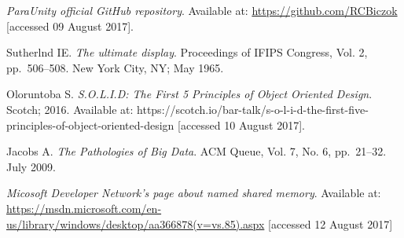 \begin{thebibliography}{99}
\textit{ParaUnity official GitHub repository}.
Available at: \url{https://github.com/RCBiczok}
[accessed 09 August 2017].

 Sutherlnd IE.
 \textit{The ultimate display}.
 Proceedings of IFIPS Congress, Vol. 2,
 pp.~506–508.
 New York City, NY;
 May 1965.
  
  Oloruntoba S. 
  \textit{S.O.L.I.D: The First 5 Principles of Object Oriented Design}.
  Scotch;
  2016.
  Available at: https://scotch.io/bar-talk/s-o-l-i-d-the-first-five-principles-of-object-oriented-design [accessed 10 August 2017].
  
  
  Jacobs A.
  \textit{The Pathologies of Big Data}.
  ACM Queue, Vol. 7, No. 6,
  pp.~21–32.
  July 2009.
  
  \textit{Micosoft Developer Network's page about named shared memory}.
  Available at: \url{https://msdn.microsoft.com/en-us/library/windows/desktop/aa366878(v=vs.85).aspx}
  [accessed 12 August 2017] 
\end{thebibliography}